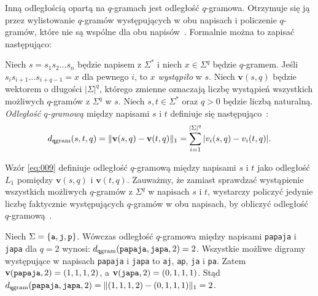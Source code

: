 \documentclass{praca1}
\DeclarePairedDelimiter{\norm}{\lVert}{\rVert}
\begin{document}

Inną odległością opartą na $q$-gramach jest odległość $q$-gramowa. Otrzymuje się ją przez wylistowanie $q$-gramów występujących w obu napisach i policzenie $q$-gramów, które nie są wspólne dla obu napisów~\cite{Loo2014:stringdist}. Formalnie można to zapisać następująco:

\begin{definition}
Niech $s = s_1 s_2 \ldots s_n$ będzie napisem z $\Sigma^*$ i niech $x \in \Sigma^q$ będzie $q$-gramem. Jeśli $s_i s_{i+1} \ldots s_{i+q-1} = x$ dla pewnego $i$, to $x$ \emph{wystąpiło} w $s$. Niech $\mathbf{v}(s,q)$ będzie wektorem o długości $|\Sigma|^q$, którego zmienne oznaczają liczbę wystąpień wszystkich możliwych $q$-gramów z $\Sigma^q$ w $s$. Niech $s, t \in \Sigma^*$ oraz $q>0$ będzie liczbą naturalną. \emph{Odległość $q$-gramową} między napisami $s$ i $t$ definiuje się następująco~\cite{Ukkonen1992:approxqgrams}:
\begin{equation}
\label{eq:009}
d_{\mathtt{q}\mathrm{gram}}(s,t,q) = \norm{\mathbf{v}(s,q) - \mathbf{v}(t,q)}_1 = \sum\limits_{i = 1}^{|\Sigma|^q} |v_i(s,q) - v_i(t,q)|.
\end{equation}
\end{definition} 

Wzór \eqref{eq:009} definiuje odległość $q$-gramową między napisami $s$ i $t$ jako odległość $L_1$ pomiędzy $\mathbf{v}(s,q)$ i $\mathbf{v}(t,q)$. Zauważmy, że zamiast sprawdzać wystąpienie wszystkich możliwych $q$-gramów z $\Sigma^q$ w napisach $s$ i $t$, wystarczy policzyć jedynie liczbę faktycznie występujących $q$-gramów w obu napisach, by obliczyć odległość $q$-gramową~\cite{Loo2014:stringdist}.

\begin{example}
\label{ex:001}
Niech $\Sigma = \{\verb|a|, \verb|j|, \verb|p|\}$. Wówczas odległość $q$-gramowa między napisami \verb|papaja| i \verb|japa| dla $q = 2$ wynosi: $d_{\mathtt{q}\mathrm{gram}}(\verb|papaja|, \verb|japa|, 2) = 2$. Wszystkie możliwe digramy występujące w napisach  \verb|papaja| i \verb|japa| to \verb|aj|, \verb|ap|, \verb|ja| i \verb|pa|. Zatem $\mathbf{v}( \verb|papaja|,2) = (1, 1, 1, 2)$, a  $\mathbf{v}( \verb|japa|,2) = (0, 1, 1, 1)$. Stąd $d_{\mathtt{q}\mathrm{gram}}(\verb|papaja|, \verb|japa|, 2) =  \norm{(1,1,1,2) - (0,1,1,1)}_1 = 2$.
\end{example}
\end{document}
